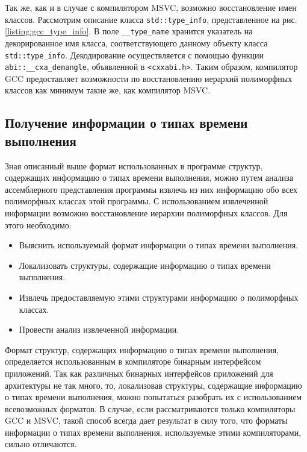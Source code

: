 Так же, как и в случае с компилятором MSVC, возможно восстановление имен классов. Рассмотрим описание класса \lstinline{std::type_info}, представленное на рис. \ref{listing:gcc_type_info}. В поле \lstinline{__type_name} хранится указатель на декорированное имя класса, соответствующего данному объекту класса \lstinline{std::type_info}. Декодирование осуществляется с помощью функции \lstinline{abi::__cxa_demangle}, объявленной в \lstinline{<cxxabi.h>}. Таким образом, компилятор GCC предоставляет возможности по восстановлению иерархий полиморфных классов как минимум такие же, как компилятор MSVC.




\subsection{Получение информации о типах времени выполнения}\label{chapter:rtti_extraction}
Зная описанный выше формат использованных в программе структур, содержащих информацию о типах времени выполнения, можно путем анализа ассемблерного представления программы извлечь из них информацию обо всех полиморфных классах этой программы. С использованием извлеченной информации возможно восстановление иерархии полиморфных классов. Для этого необходимо:

\begin{itemize}
\item Выяснить используемый формат информации о типах времени выполнения.
\item Локализовать структуры, содержащие информацию о типах времени выполнения.
\item Извлечь предоставляемую этими структурами информацию о полиморфных классах.
\item Провести анализ извлеченной информации.
\end{itemize}

Формат структур, содержащих информацию о типах времени выполнения, определяется использованным в компиляторе бинарным интерфейсом приложений. Так как различных бинарных интерфейсов приложений для архитектуры не так много, то, локализовав структуры, содержащие информацию о типах времени выполнения, можно попытаться разобрать их с использованием всевозможных форматов. В случае, если рассматриваются только компиляторы GCC и MSVC, такой способ всегда дает результат в силу того, что форматы информации о типах времени выполнения, используемые этими компиляторами, сильно отличаются.

